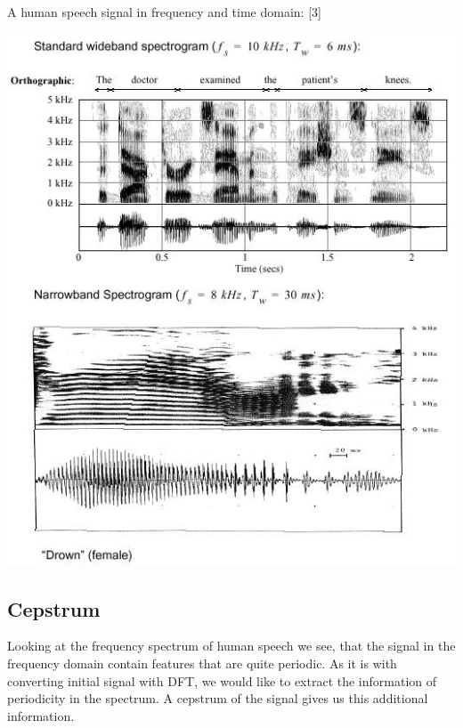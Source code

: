 \documentclass[12pt,a4paper,english]{article}
\begin{document}
\newpage
A human speech signal in frequency and time domain: [3]
\begin{center}
    \includegraphics[scale=0.8]{speech_spectrogram.jpg}
\end {center}

\newpage
\subsection{Cepstrum}

Looking at the frequency spectrum of human speech we see, that  the signal in the frequency domain contain features that are quite periodic. As it is with converting initial signal with DFT, we would like to extract the information of periodicity in the spectrum. 
A cepstrum of the signal gives us this additional information. \newline
\end{document}
